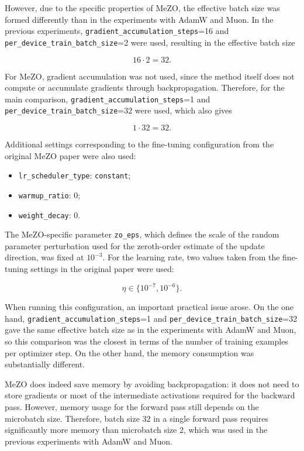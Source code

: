 \documentclass{article}
\begin{document}
However, due to the specific properties of MeZO, the effective batch size was formed differently than in the experiments with AdamW and Muon. In the previous experiments, \texttt{gradient\_accumulation\_steps}=16 and \texttt{per\_device\_train\_batch\_size}=2 were used, resulting in the effective batch size

\[
16 \cdot 2 = 32.
\]

For MeZO, gradient accumulation was not used, since the method itself does not compute or accumulate gradients through backpropagation. Therefore, for the main comparison, \texttt{gradient\_accumulation\_steps}=1 and \texttt{per\_device\_train\_batch\_size}=32 were used, which also gives

\[
1 \cdot 32 = 32.
\]

Additional settings corresponding to the fine-tuning configuration from the original MeZO paper were also used:

\begin{itemize}
    \item \texttt{lr\_scheduler\_type}: \texttt{constant};
    \item \texttt{warmup\_ratio}: $0$;
    \item \texttt{weight\_decay}: $0$.
\end{itemize}

The MeZO-specific parameter \texttt{zo\_eps}, which defines the scale of the random parameter perturbation used for the zeroth-order estimate of the update direction, was fixed at $10^{-3}$. For the learning rate, two values taken from the fine-tuning settings in the original paper were used:

\[
\eta \in \{10^{-7}, 10^{-6}\}.
\]

When running this configuration, an important practical issue arose. On the one hand, \texttt{gradient\_accumulation\_steps}=1 and \texttt{per\_device\_train\_batch\_size}=32 gave the same effective batch size as in the experiments with AdamW and Muon, so this comparison was the closest in terms of the number of training examples per optimizer step. On the other hand, the memory consumption was substantially different.

MeZO does indeed save memory by avoiding backpropagation: it does not need to store gradients or most of the intermediate activations required for the backward pass. However, memory usage for the forward pass still depends on the microbatch size. Therefore, batch size $32$ in a single forward pass requires significantly more memory than microbatch size $2$, which was used in the previous experiments with AdamW and Muon.
\end{document}
